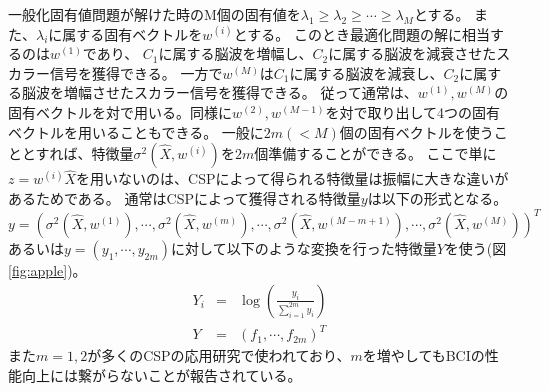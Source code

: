 一般化固有値問題が解けた時のM個の固有値を\(\lambda_1 \geq \lambda_2 \geq \cdots \geq \lambda_M\)とする。
また、\(\lambda_i\)に属する固有ベクトルを\(w^{(i)}\)とする。
このとき最適化問題の解に相当するのは\(w^{(1)}\)であり、
\(C_1\)に属する脳波を増幅し、\(C_2\)に属する脳波を減衰させたスカラー信号を獲得できる。
一方で\(w^{(M)}\)は\(C_1\)に属する脳波を減衰し、\(C_2\)に属する脳波を増幅させたスカラー信号を獲得できる。
従って通常は、\(w^{(1)},w^{(M)}\)の固有ベクトルを対で用いる。同様に\(w^{(2)},w^{(M-1)}\)を対で取り出して4つの固有ベクトルを用いることもできる。
一般に\(2m(<M)\)個の固有ベクトルを使うこととすれば、特徴量\(\sigma^2(\hat X,w^{(i)})\)を\(2m\)個準備することができる。
ここで単に\(z=w^{(i)}\hat X\)を用いないのは、CSPによって得られる特徴量は振幅に大きな違いがあるためである。
通常はCSPによって獲得される特徴量\(y\)は以下の形式となる。
\begin{equation}
    y = (\sigma^2(\hat X,w^{(1)}), \cdots, \sigma^2(\hat X,w^{(m)}), \cdots, \sigma^2(\hat X,w^{(M-m+1)}), \cdots, \sigma^2(\hat X,w^{(M)}))^T
\end{equation}
あるいは\(y=(y_1, \cdots, y_{2m})\)に対して以下のような変換を行った特徴量\(Y\)を使う(図\ref{fig:apple})。
\begin{eqnarray}
    Y_i &=& \log \left( \frac{y_i}{\sum_{i=1}^{2m}y_i} \right) \nonumber \\
    Y &=& (f_1, \cdots, f_{2m})^T 
\end{eqnarray}
また\(m=1,2\)が多くのCSPの応用研究で使われており、\(m\)を増やしてもBCIの性能向上には繋がらないことが報告されている\cite{cvscsp}。

